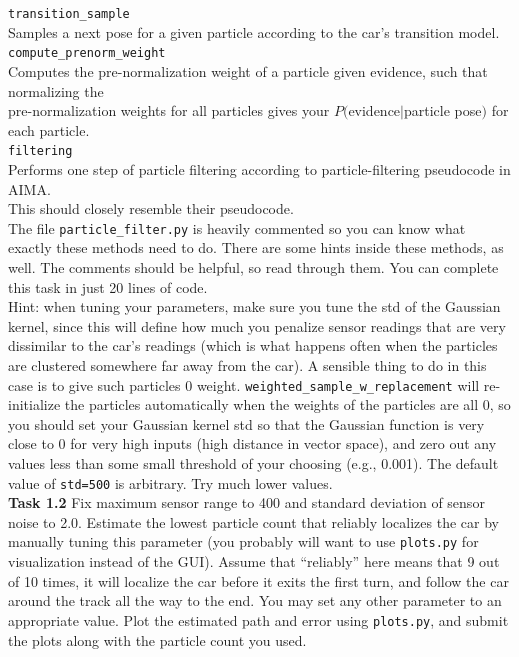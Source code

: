 \documentclass[a4paper]{article}
\theoremstyle{definition}
\theoremstyle{plain}
\begin{document}
\indent \texttt{transition\_sample}\\
\indent Samples a next pose for a given particle according to the car's transition model.\\

\indent \texttt{compute\_prenorm\_weight}\\
\indent Computes the pre-normalization weight of a particle given evidence, such that normalizing the\\
\indent pre-normalization weights for all particles gives your $P($evidence$\mid$particle pose$)$ for each particle.\\

\indent \texttt{filtering}\\
\indent Performs one step of particle filtering according to particle-filtering pseudocode in AIMA.\\
\indent This should closely resemble their pseudocode.\\

\noindent The file \texttt{particle\_filter.py} is heavily commented so you can know what exactly these methods need to do. There are some hints inside these methods, as well. The comments should be helpful, so read through them. You can complete this task in just 20 lines of code.\\

\noindent
Hint: when tuning your parameters, make sure you tune the std of the Gaussian kernel, since this will define how much you penalize sensor readings that are very dissimilar to the car's readings (which is what happens often when the particles are clustered somewhere far away from the car). A sensible thing to do in this case is to give such particles 0 weight. \texttt{weighted\_sample\_w\_replacement} will re-initialize the particles automatically when the weights of the particles are all 0, so you should set your Gaussian kernel std so that the Gaussian function is very close to 0 for very high inputs (high distance in vector space), and zero out any values less than some small threshold of your choosing (e.g., 0.001). The default value of \texttt{std=500} is arbitrary. Try much lower values.\\

\noindent
\textbf{Task 1.2} Fix maximum sensor range to 400 and standard deviation of sensor noise to 2.0. Estimate the lowest particle count that reliably localizes the car by manually tuning this parameter (you probably will want to use \texttt{plots.py} for visualization instead of the GUI). Assume that ``reliably'' here means that 9 out of 10 times, it will localize the car before it exits the first turn, and follow the car around the track all the way to the end. You may set any other parameter to an appropriate value. Plot the estimated path and error using \texttt{plots.py}, and submit the plots along with the particle count you used.\\
\end{document}
